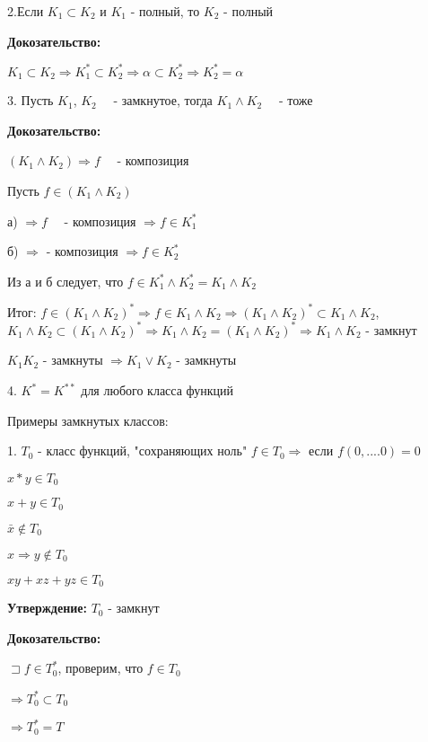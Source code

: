 \documentclass[russian]{lecture-notes}
\begin{document}
	2.Если $K_{1} \subset K_{2}$ и $K_{1}$ - полный, то $K_{2}$ - полный

	\textbf{Докозательство:}

	$K_{1} \subset K_{2} \Rightarrow K_{1}^{*} \subset K_{2}^{*} \Rightarrow \alpha
	 \subset K_{2}^{*} \Rightarrow K_{2}^{*} = \alpha
	$

	3. Пусть $K_{1}$, $K_{2}$ ~~- замкнутое, тогда $K_{1} \wedge K_{2}$ ~~- тоже

	\textbf{Докозательство:}

	$(K_{1} \wedge K_{2}) \Rightarrow f $ ~~- композиция

	Пусть $f \in (K_{1} \wedge K_{2})$

	а) $\Rightarrow f $ ~~- композиция $\Rightarrow f \in K_{1}^{*}$

	б) $\Rightarrow$ - композиция $\Rightarrow f \in K_{2}^{*}$

	Из а и б следует, что $ f \in K_{1}^{*} \wedge K_{2}^{*} = K_{1} \wedge K_{2}$

	Итог: $f \in (K_{1} \wedge K_{2})^{*} \Rightarrow f \in K_{1} \wedge K_{2} \Rightarrow
	(K_{1} \wedge K_{2})^{*} \subset K_{1} \wedge K_{2}$, $K_{1} \wedge K_{2} \subset (K_{1}
	\wedge K_{2})^{*} \Rightarrow K_{1} \wedge K_{2} = (K_{1} \wedge K_{2})^{*}
	\Rightarrow K_{1} \wedge K_{2} $ - замкнут

	\begin{remark}
		$K_{1}K_{2}$ - замкнуты $\Rightarrow K_{1} \lor K_{2} $ - замкнуты
		\end{remark}

	4. $K^{*} = K^{**}$ для любого класса функций

	Примеры замкнутых классов:

	1. $T_{0}$ - класс функций, "сохраняющих ноль" $f \in T_{0} \Rightarrow$  если
	$f(0,....0) = 0
	$

	$x*y \in T_{0}$

	$x+y \in T_{0}$

	$\bar{x} \notin T_{0}$

	$x \Rightarrow y \notin T_{0}$

	$xy + xz + yz \in T_{0}$

	\textbf{Утверждение:} $T_{0} $ - замкнут

	\textbf{Докозательство:}

	$\sqsupset f \in T_{0}^{*}$, проверим, что $f \in T_{0}$

	$\Rightarrow T_{0}^{*} \subset T_{0}$

	$\Rightarrow T_{0}^{*} = T$
\end{document}
